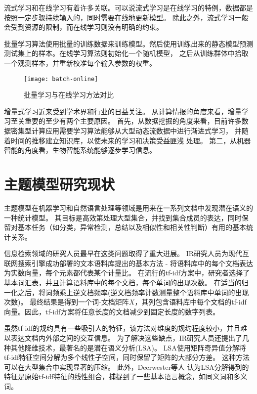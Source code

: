 流式学习和在线学习有着许多关联。可以说流式学习是在线学习的特例，数据都是按照一定步骤持续输入的，同时需要在线地更新模型。
除此之外，流式学习一般会受到资源的限制，而在线学习则没有明确的约束。

批量学习算法使用批量的训练数据来训练模型。然后使用训练出来的静态模型预测测试集上的样本。在线学习算法则初始化一个随机模型，
之后从训练群体中拾取一个观测样本，并重新校准每个输入参数的权重。

\begin{figure}[htb]\centering
  \texttt{[image: batch-online]}
  \caption{批量学习与在线学习方法对比}
  \label{fig:batch-online}       %
\end{figure}

增量式学习近来受到学术界和行业的日益关注。 从计算情报的角度来看，增量学习至关重要的至少有两个主要原因。
首先，从数据挖掘的角度来看，目前许多数据密集型计算应用需要学习算法能够从大型动态流数据中进行渐进式学习，
并随着时间的推移建立知识库，以使未来的学习和决策受益匪浅 处理。 第二，从机器智能的角度看，生物智能系统能够逐步学习信息。

\section{主题模型研究现状}
主题模型在机器学习和自然语言处理等领域是用来在一系列文档中发现潜在语义的一种统计模型。
其目标是高效第处理大型集合，并找到集合成员的表达，同时保留对基本任务（如分类，异常检测，总结以及相似性和相关性判断）有用的基本统计关系。

信息检索领域的研究人员最早在这类问题\cite{baeza1999modern}取得了重大进展。
IR研究人员为现代互联网搜索引擎成功部署的文本语料库提出的基本方法 - 将语料库中的每个文档表达为实数向量，每个元素都代表某个计量比。 
在流行的tf-idf方案\cite{salton1986introduction}中，研究者选择了基本词汇表，并且计算语料库中的每个文档，每个单词的出现次数。
在适当的归一化之后，将词频乘上逆文档频率(逆文档频率计数测量整个语料库中单词的出现次数)。
最终结果是得到一个词-文档矩阵$X$，其列包含语料库中每个文档的tf-idf向量。因此，tf-idf方案将任意长度的文档减少到固定长度的数字列表。

虽然tf-idf的规约具有一些吸引人的特征，该方法对维度的规约程度较小，并且难以表达文档内外部之间的交互信息。
为了解决这些缺点，IR研究人员还提出了几种其他降维技术，最著名的是潜在语义分析(LSA)\cite{deerwester1990indexing}。
LSA使用矩阵奇异值分解将tf-idf特征空间分解为多个线性子空间，同时保留了矩阵的大部分方差。
这种方法可以在大型集合中实现显著的压缩。 此外，Deerwester等人 认为LSA分解得到的特征是原始tf-idf特征的线性组合，捕捉到了一些基本语言概念，如同义词和多义词。

